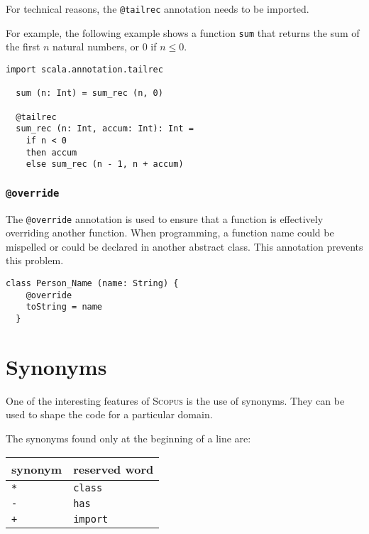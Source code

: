 \documentclass[12pt,a4paper]{article}
\makeatletter
\newcommand{\srccode}[1]{\texttt{{#1}}}
\newcommand{\reservedWord}[1]{{\color{blue}\srccode{#1}}\xspace}
\newcommand{\annotation}[1]{{\color{brown}\srccode{#1}}\xspace}
\newcommand{\sclass}{\reservedWord{class}}
\newcommand{\shas}{\reservedWord{has}}
\newcommand{\simport}{\reservedWord{import}}
\newcommand{\stailrec}{\annotation{@tailrec}}
\newcommand{\soverride}{\annotation{@override}}
\newcommand{\sasterisk}{\srccode{*}}
\newcommand{\splus}{\srccode{+}}
\newcommand{\sminus}{\srccode{-}}
\newcommand{\Scopus}{\textsc{Scopus}\xspace}
\makeatother
\begin{document}
    For technical reasons, the \stailrec annotation needs to be imported.

    For example, the following example shows a function \srccode{sum} that returns the sum of the first $n$ natural numbers, or 0 if $n \leq 0$.

    \begin{lstlisting}[label={lst:exampleTailrec}]
  import scala.annotation.tailrec

  sum (n: Int) = sum_rec (n, 0)

  @tailrec
  sum_rec (n: Int, accum: Int): Int =
    if n < 0
    then accum
    else sum_rec (n - 1, n + accum)

    \end{lstlisting}

    \subsubsection{\soverride}

    The \soverride annotation is used to ensure that a function is effectively overriding another function.
    When programming, a function name could be mispelled or could be declared in another abstract class.
    This annotation prevents this problem.

    \begin{lstlisting}[label={lst:exampleOverride}]
  class Person_Name (name: String) {
    @override
    toString = name
  }
    \end{lstlisting}


    \section{Synonyms}

    One of the interesting features of \Scopus is the use of synonyms.
    They can be used to shape the code for a particular domain.

    The synonyms found only at the beginning of a line are:

    \begin{center}
        \begin{tabular}{|ll|}
            \hline
            \textbf{synonym} & \textbf{reserved word} \\
            \hline
            \sasterisk       & \sclass                \\
            \hline
            \sminus          & \shas                  \\
            \hline
            \splus           & \simport               \\
            \hline
        \end{tabular}
    \end{center}
\end{document}
